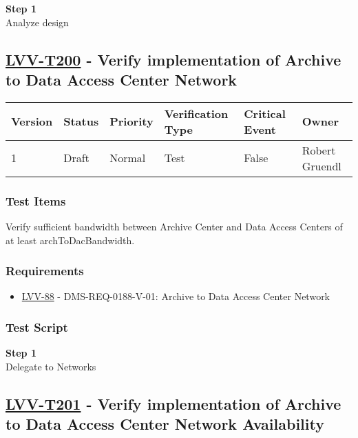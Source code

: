 \textbf{Step 1}\\
Analyze design\\[2\baselineskip]

\hypertarget{lvv-t200---verify-implementation-of-archive-to-data-access-center-network}{\subsection{\texorpdfstring{\href{https://jira.lsstcorp.org/secure/Tests.jspa\#/testCase/LVV-T200}{LVV-T200}
- Verify implementation of Archive to Data Access Center
Network}{LVV-T200 - Verify implementation of Archive to Data Access Center Network}}\label{lvv-t200---verify-implementation-of-archive-to-data-access-center-network}}

\begin{longtable}[]{@{}llllll@{}}
\toprule
Version & Status & Priority & Verification Type & Critical Event &
Owner\tabularnewline
\midrule
\endhead
1 & Draft & Normal & Test & False & Robert Gruendl\tabularnewline
\bottomrule
\end{longtable}

\subsubsection{Test Items}\label{test-items-59}

Verify sufficient bandwidth between Archive Center and Data Access
Centers of at least archToDacBandwidth.

\subsubsection{Requirements}\label{requirements-59}

\begin{itemize}
\tightlist
\item
  \href{https://jira.lsstcorp.org/browse/LVV-88}{LVV-88} -
  DMS-REQ-0188-V-01: Archive to Data Access Center Network
\end{itemize}

\subsubsection{Test Script}\label{test-script-59}

\textbf{Step 1}\\
Delegate to Networks\\[2\baselineskip]

\hypertarget{lvv-t201---verify-implementation-of-archive-to-data-access-center-network-availability}{\subsection{\texorpdfstring{\href{https://jira.lsstcorp.org/secure/Tests.jspa\#/testCase/LVV-T201}{LVV-T201}
- Verify implementation of Archive to Data Access Center Network
Availability}{LVV-T201 - Verify implementation of Archive to Data Access Center Network Availability}}\label{lvv-t201---verify-implementation-of-archive-to-data-access-center-network-availability}}

